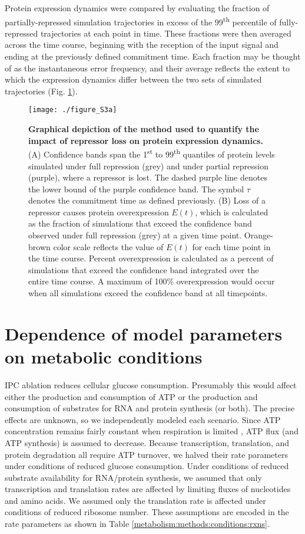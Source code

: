 Protein expression dynamics were compared by evaluating the fraction of partially-repressed simulation trajectories in excess of the 99\textsuperscript{th} percentile of fully-repressed trajectories at each point in time. These fractions were then averaged across the time course, beginning with the reception of the input signal and ending at the previously defined commitment time. Each fraction may be thought of as the instantaneous error frequency, and their average reflects the extent to which the expression dynamics differ between the two sets of simulated trajectories (Fig. \ref{fig:metabolism:figS3a}).

\begin{figure}[h!]
\centering
\texttt{[image: ./figure\_S3a]}
\caption[Evaluation of protein overexpression metric.]{\textbf{Graphical depiction of the method used to quantify the impact of repressor loss on protein expression dynamics.} (A) Confidence bands span the 1\textsuperscript{st} to 99\textsuperscript{th} quantiles of protein levels simulated under full repression (grey) and under partial repression (purple), where a repressor is lost. The dashed purple line denotes the lower bound of the purple confidence band. The symbol $\tau$ denotes the commitment time as defined previously. (B) Loss of a repressor causes protein overexpression $E(t)$, which is calculated as the fraction of simulations that exceed the confidence band observed under full repression (grey) at a given time point. Orange-brown color scale reflects the value of $E(t)$ for each time point in the time course. Percent overexpression is calculated as a percent of simulations that exceed the confidence band integrated over the entire time course. A maximum of 100\% overexpression would occur when all simulations exceed the confidence band at all timepoints.}
\label{fig:metabolism:figS3a}
\end{figure}

\section{Dependence of model parameters on metabolic conditions}
\label{metabolism:methods:conditions}

IPC ablation reduces cellular glucose consumption. Presumably this would affect either the production and consumption of ATP or the production and consumption of substrates for RNA and protein synthesis (or both). The precise effects are unknown, so we independently modeled each scenario. Since ATP concentration remains fairly constant when respiration is limited \cite{Brown1992}, ATP flux (and ATP synthesis) is assumed to decrease. Because transcription, translation, and protein degradation all require ATP turnover, we halved their rate parameters under conditions of reduced glucose consumption. Under conditions of reduced substrate availability for RNA/protein synthesis, we assumed that only transcription and translation rates are affected by limiting fluxes of nucleotides and amino acids. We assumed only the translation rate is affected under conditions of reduced ribosome number. These assumptions are encoded in the rate parameters as shown in Table \ref{metabolism:methods:conditions:rxns}.

